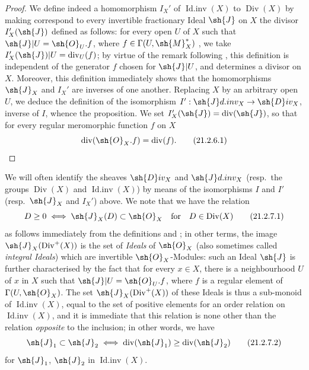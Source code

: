 \begin{proof}
We define indeed a homomorphism $I_X'$ of $\operatorname{Id.inv}(X)$ to $\operatorname{Div}(X)$ by making correspond to every invertible fractionary Ideal $\sh{J}$ on $X$ the divisor $I_X'(\sh{J})$ defined as follows:
for every open $U$ of $X$ such that $\sh{J}|U=\sh{O}_U.f$, where $f\in\Gamma(U,\sh{M}_X^*)$ , we take $I_X'(\sh{J})|U=\operatorname{div}_U(f)$;
by virtue of the remark following , this definition is independent of the generator $f$ chosen for $\sh{J}|U$, and determines a divisor on $X$.
Moreover, this definition immediately shows that the homomorphisms $\sh{J}_X$ and $I_X'$ are inverses of one another.
Replacing $X$ by an arbitrary open $U$, we deduce the definition of the isomorphism $I':\sh{J}d.inv_X\to\sh{D}iv_X$, inverse of $I$, whence the proposition.
We set $I_X'(\sh{J})=\operatorname{div}(\sh{J})$, so that for every regular meromorphic function $f$ on $X$
\[
\label{IV.21.2.6.1}
  \operatorname{div}(\sh{O}_X.f)=\operatorname{div}(f).
  \tag{21.2.6.1}
\]
\end{proof}

\begin{env}[21.2.7]
\label{IV.21.2.7}
We will often identify the sheaves $\sh{D}iv_X$ and $\sh{J}d.inv_X$ (resp.\ the groups $\operatorname{Div}(X)$ and $\operatorname{Id.inv}(X)$) by means of the isomorphisms $I$ and $I'$ (resp.\ $\sh{J}_X$ and $I_X'$) above.
We note that we have the relation
\[
\label{IV.21.2.7.1}
  D\geq 0 \iff \sh{J}_X(D)\subset\sh{O}_X \quad\text{for}\quad D\in\operatorname{Div}(X)
  \tag{21.2.7.1}
\]
as follows immediately from the definitions  and ;
in other terms, the image $\sh{J}_X(\operatorname{Div}^+(X))$ is the set of \emph{Ideals} of $\sh{O}_X$ (also sometimes called \emph{integral Ideals}) which are invertible $\sh{O}_X$-Modules:
such an Ideal $\sh{J}$ is further characterised by the fact that for every $x\in X$, there is a neighbourhood $U$ of $x$ in $X$ such that $\sh{J}|U=\sh{O}_U.f$, where $f$ is a regular element of $\Gamma(U,\sh{O}_X)$.
The set $\sh{J}_X(\operatorname{Div}^+(X))$ of these Ideals is thus a sub-monoid of $\operatorname{Id.inv}(X)$, equal to the set of positive elements for an order relation on $\operatorname{Id.inv}(X)$, and it is immediate that this relation is none other than the relation \emph{opposite} to the inclusion;
in other words, we have
\[
\label{IV.21.2.7.2}
  \sh{J}_1\subset\sh{J}_2 \iff \operatorname{div}(\sh{J}_1)\geq\operatorname{div}(\sh{J}_2)
  \tag{21.2.7.2}
\]
for $\sh{J}_1$, $\sh{J}_2$ in $\operatorname{Id.inv}(X)$.
\end{env}

